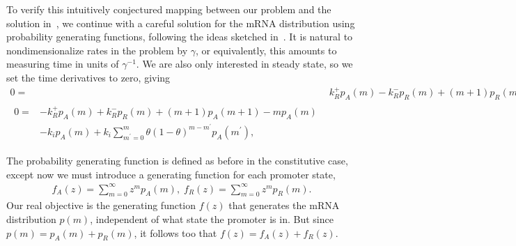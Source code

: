 To verify this intuitively conjectured mapping between our problem and
the solution in~\cite{Shahrezaei2008}, we continue with a careful
solution for the mRNA distribution using probability generating functions,
following the ideas sketched in~\cite{Shahrezaei2008}.
It is natural to nondimensionalize rates in the problem by $\gamma$,
or equivalently, this amounts to measuring time in units of $\gamma^{-1}$.
We are also only interested in steady state, so we set the time
derivatives to zero, giving
\begin{align}
0 =& k_R^+ p_A(m) - k_R^- p_R(m) + (m+1) p_R(m+1) - m p_R(m)
\\
\begin{split}
0 =& - k_R^+ p_A(m) + k_R^- p_R(m) + (m+1) p_A(m+1) - m p_A(m) 
\\
&- k_i p_A(m) + k_i \sum_{m^\prime=0}^m \theta(1-\theta)^{m-m^\prime} p_A(m^\prime),
\end{split}
\end{align}
        
The probability generating function is defined as before in the
constitutive case, except now we must introduce a generating function
for each promoter state,
\begin{align}
f_A(z) = \sum_{m=0}^\infty z^m p_A(m),
\;
f_R(z) = \sum_{m=0}^\infty z^m p_R(m).
\end{align}
Our real objective is the generating function $f(z)$ that generates
the mRNA distribution $p(m)$, independent of what state the promoter is in.
But since $p(m) = p_A(m) + p_R(m)$, it follows too that $f(z) = f_A(z) + f_R(z)$.

